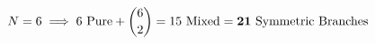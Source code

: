 \documentclass[preview]{standalone}
\begin{document}
\begin{align*}
\special{dvisvgm:raw <g id='unique000'>}N=6 \implies 6\text{ Pure} + \binom{6}{2}=15\text{ Mixed} = \mathbf{21\text{ Symmetric Branches}}\special{dvisvgm:raw </g>}
\end{align*}
\end{document}

